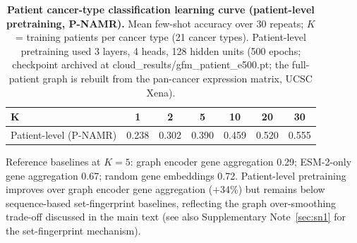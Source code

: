 \documentclass[11pt,a4paper]{article}
\newcounter{suppnote}
\newcommand{\suppnote}[1]{Supplementary Note~\ref{#1}}
\begin{document}
\begin{table}[H]
\centering
\caption{\textbf{Patient cancer-type classification learning curve (patient-level pretraining, P-NAMR).} Mean few-shot accuracy over 30 repeats; $K$ = training patients per cancer type (21 cancer types). Patient-level pretraining used 3 layers, 4 heads, 128 hidden units (500 epochs; checkpoint archived at cloud\_results/gfm\_patient\_e500.pt; the full-patient graph is rebuilt from the pan-cancer expression matrix, UCSC Xena).}
\label{tab:s7}
\footnotesize
\begin{tabular}{@{}lcccccc@{}}
\toprule
\textbf{K} & \textbf{1} & \textbf{2} & \textbf{5} & \textbf{10} & \textbf{20} & \textbf{30} \\
\midrule
Patient-level (P-NAMR) & 0.238 & 0.302 & 0.390 & 0.459 & 0.520 & 0.555 \\
\bottomrule
\end{tabular}
\end{table}



\noindent Reference baselines at $K=5$: graph encoder gene aggregation 0.29; ESM-2-only gene aggregation 0.67; random gene embeddings 0.72. Patient-level pretraining improves over graph encoder gene aggregation (+34\%) but remains below sequence-based set-fingerprint baselines, reflecting the graph over-smoothing trade-off discussed in the main text (see also \suppnote{sec:sn1} for the set-fingerprint mechanism).
\end{document}
